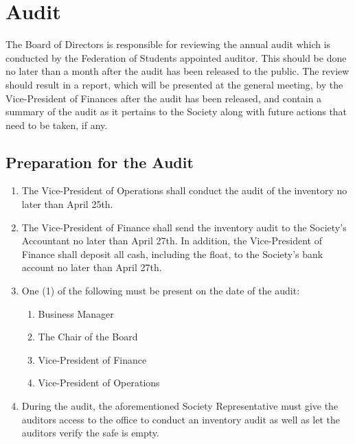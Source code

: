 \section{Audit}

The Board of Directors is responsible for reviewing the annual audit which is conducted 
by the Federation of Students appointed auditor. 
This should be done no later than a month after the audit has been released to the public. 
The review should result in a report, which will be presented at the general meeting, by 
the Vice-President of Finances after the audit has been released, and contain a summary of the 
audit as it pertains to the Society along with future actions that need to be taken, if any.

\subsection{Preparation for the Audit}
\begin{enumerate}
    \item The Vice-President of Operations shall conduct the audit of the inventory no later than April 25th.
    \item The Vice-President of Finance shall send the inventory audit to the Society's Accountant no later than April 27th. 
        In addition, the Vice-President of Finance shall deposit all cash, including the float, to the Society's bank account no later than April 27th.
    \item One (1) of the following must be present on the date of the audit: 
    \begin{enumerate}
        \item Business Manager 
        \item The Chair of the Board
        \item Vice-President of Finance 
        \item Vice-President of Operations 
    \end{enumerate}
    \item During the audit, the aforementioned Society Representative must give the auditors
        access to the office to conduct an inventory audit as well as let the auditors verify the safe is empty. 
\end{enumerate}

    

